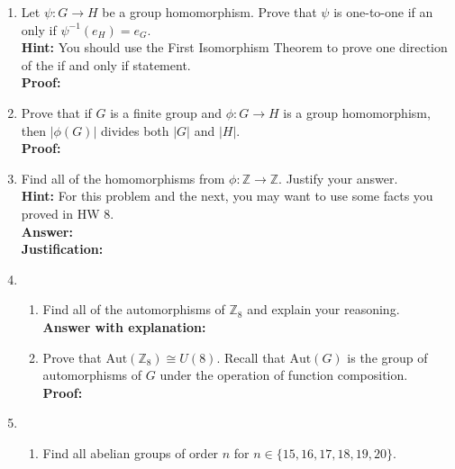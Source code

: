 \documentclass[12pt]{article}
\begin{document}
\begin{enumerate}
\item Let $\psi: G \to H$ be a group homomorphism. Prove that $\psi$ is one-to-one if an only if $\psi^{-1}(e_H)=e_G.$\\ \textbf{Hint:} You should use the First Isomorphism Theorem to prove one direction of the if and only if statement.\\

\textbf{Proof:}\\

\vfill

\item Prove that if $G$ is a finite group and $\phi: G \to H$ is a group homomorphism, then $|\phi(G)|$ divides both $|G|$ and $|H|.$\\

\textbf{Proof:}\\

\vfill
\newpage
\item Find all of the homomorphisms from $\phi: \mathbb{Z} \to \mathbb{Z}.$ Justify your answer.\\
\textbf{Hint:} For this problem and the next, you may want to use some facts you proved in HW 8.\\

\textbf{Answer:} \\
\textbf{Justification:} \\
\vfill

\item 
	\begin{enumerate}
	\item Find all of the automorphisms of $\mathbb{Z}_8$ and explain your reasoning. \\

\textbf{Answer with explanation:}\\

	\item Prove that $\text{Aut}(\mathbb{Z}_8)\cong U(8).$ Recall that $\text{Aut}(G)$ is the group of automorphisms of $G$ under the operation of function composition.\\

\textbf{Proof:}\\
	\end{enumerate}

\vfill

\item 
	\begin{enumerate}
	\item Find all abelian groups of order $n$ for $n \in \{15,16,17,18,19,20\}.$\\


\end{enumerate}
\end{enumerate}
\end{document}
